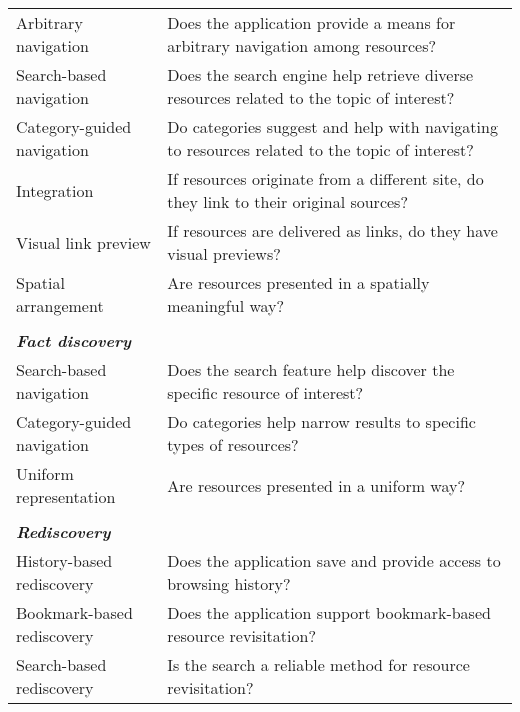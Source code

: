 \documentclass{casconpaper}
\begin{document}
{\begin{table*}[htbp]
\begin{tabular}{|p{0.30\linewidth}|p{0.70\linewidth}|}
Arbitrary navigation         & Does the application provide a means for arbitrary navigation among resources?                              \\
Search-based navigation      & Does the search engine help retrieve diverse resources related to the topic of interest?               \\
Category-guided navigation & Do categories suggest and help with navigating to resources related to the topic of interest?           \\
Integration                  & If resources originate from a different site, do they link to their original sources?                   \\
Visual link preview               & If resources are delivered as links, do they have visual previews?                                                                        \\
Spatial arrangement          & Are resources presented in a spatially meaningful way?                                                    \\
&\\
\emph{\textbf{Fact discovery}}                &                                                                                                           \\
Search-based navigation      & Does the search feature help discover the specific resource of interest?                                  \\
Category-guided navigation & Do categories help narrow results to specific types of resources?                                   \\
Uniform representation       & Are resources presented in a uniform way?                                                                 \\
&\\
\emph{\textbf{Rediscovery}}                     &                                                                                                           \\
History-based rediscovery    & Does the application save and provide access to browsing history?                                        \\
Bookmark-based rediscovery   & Does the application support bookmark-based resource revisitation?                                        \\
Search-based rediscovery     & Is the search a reliable method for resource revisitation?                             \\

\end{tabular}
\end{table*}}
\end{document}
